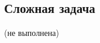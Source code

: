 \documentclass[a4paper,11pt]{article}
\begin{document}
\subsection{Сложная задача}

(не выполнена)

\end{document}
